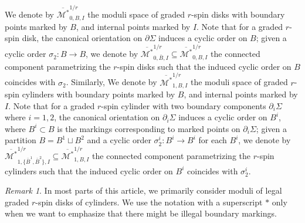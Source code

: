 \documentclass[11pt]{amsart}
\theoremstyle{definition}
\theoremstyle{remark}
\newtheorem{rmk}[dummy]{Remark}
\newcommand{\<}{\left<}
\renewcommand{\>}{\right>}
\numberwithin{equation}{section}
\def\Mbarstar{{\overline{\mathcal M^*}}}
\begin{document}
We denote by $\Mbarstar_{0,B,I}^{1/r}$ the moduli space of graded $r$-spin disks with boundary points marked by $B$, and internal points marked by $I$. Note that for a graded $r$-spin disk, the canonical orientation on $\partial\Sigma$ induces a cyclic order on $B$; given a cyclic order $\sigma_2\colon B \to B$, we denote by $\Mbarstar_{0,\bar{B},I}^{1/r}\subseteq \Mbarstar_{0,{B},I}^{1/r}$ the connected component parametrizing the $r$-spin disks such that the induced cyclic order on $B$ coincides with $\sigma_2$. 
Similarly, We denote by $\Mbarstar_{1,B,I}^{1/r}$ the moduli space of graded $r$-spin cylinders with boundary points marked by $B$, and internal points marked by $I$. Note that for a graded $r$-spin cylinder with two boundary components $\partial_i\Sigma$ where $i=1,2$, the canonical orientation on $\partial_i\Sigma$ induces a cyclic order on $B^i$, where $B^i\subset B$ is the markings corresponding to marked points on $\partial_i\Sigma$; given a partition %
$B=B^1\sqcup B^2$ and %
a cyclic order $\sigma_2^i\colon B^i \to B^i$ for each $B^i$, we denote by $\Mbarstar_{1,\{\bar{B}^1,\bar B^2\},I}^{1/r}\subseteq \Mbarstar_{1,{B},I}^{1/r}$ the connected component parametrizing the $r$-spin cylinders such that the induced cyclic order on $B^i$ coincides with $\sigma^i_2$. 


\begin{rmk}
   In most parts of this article, we primarily consider moduli of legal graded $r$-spin disks of cylinders. We use the notation with a %
superscript $*$ only %
when we want to emphasize that there might be illegal boundary markings. 
\end{rmk}
\end{document}
